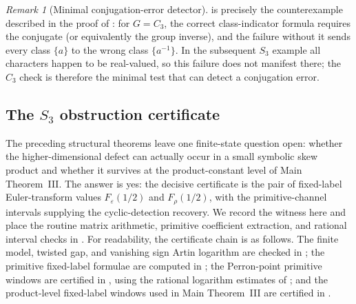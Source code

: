 \documentclass[11pt,a4paper]{amsart}
\theoremstyle{plain}
\theoremstyle{definition}
\theoremstyle{remark}
\newtheorem{remark}[theorem]{Remark}
\begin{document}
\begin{remark}[Minimal conjugation-error detector]
  \label{rem:minimal-conjugation-error-detector}
   is precisely the counterexample
  described in the proof of : for
  \(G=C_3\), the correct class-indicator formula requires the conjugate
  (or equivalently the group inverse), and the failure without it sends
  every class \(\{a\}\) to the wrong class \(\{a^{-1}\}\). In the
  subsequent \(S_3\) example all characters happen to be real-valued,
  so this failure does not manifest there; the \(C_3\) check is therefore
  the minimal test that can detect a conjugation error.
\end{remark}

\subsection{The \texorpdfstring{$S_3$}{S3} obstruction certificate}
\label{subsec:s3-obstruction-certificate}

The preceding structural theorems leave one finite-state question open:
whether the higher-dimensional defect can actually occur in a small
symbolic skew product and whether it survives at the product-constant
level of Main Theorem~III.  The answer is yes: the decisive certificate is
the pair of fixed-label Euler-transform values
\(F_\varepsilon(1/2)\) and \(F_\rho(1/2)\), with the primitive-channel
intervals supplying the cyclic-detection recovery.  We record the witness
here and place the routine matrix arithmetic, primitive coefficient
extraction, and rational interval checks in
.
For readability, the certificate chain is as follows.  The finite model,
twisted gap, and vanishing sign Artin logarithm are checked in
; the primitive fixed-label formulae are
computed in ; the Perron-point
primitive windows are certified in ,
using the rational logarithm estimates of
; and the product-level
fixed-label windows used in Main Theorem~III are certified in
.
\end{document}
